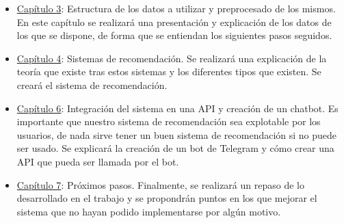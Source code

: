 \begin{itemize}
    \item \hyperref[chap:adq]{Capítulo 3}: Estructura de los datos a utilizar y preprocesado de los mismos. En este capítulo se realizará una presentación y explicación de los datos de los que se dispone, de forma que se entiendan los siguientes pasos seguidos.
    \item \hyperref[chap:recom]{Capítulo 4}: Sistemas de recomendación. Se realizará una explicación de la teoría que existe tras estos sistemas y los diferentes tipos que existen. Se creará el sistema de recomendación.
    \item \hyperref[chap:api]{Capítulo 6}: Integración del sistema en una API y creación de un chatbot. Es importante que nuestro sistema de recomendación sea explotable por los usuarios, de nada sirve tener un buen sistema de recomendación si no puede ser usado. Se explicará la creación de un bot de Telegram y cómo crear una API que pueda ser llamada por el bot.
    \item \hyperref[chap:resultados]{Capítulo 7}: Próximos pasos. Finalmente, se realizará un repaso de lo desarrollado en el trabajo y se propondrán puntos en los que mejorar el sistema que no hayan podido implementarse por algún motivo.
\end{itemize}

    
